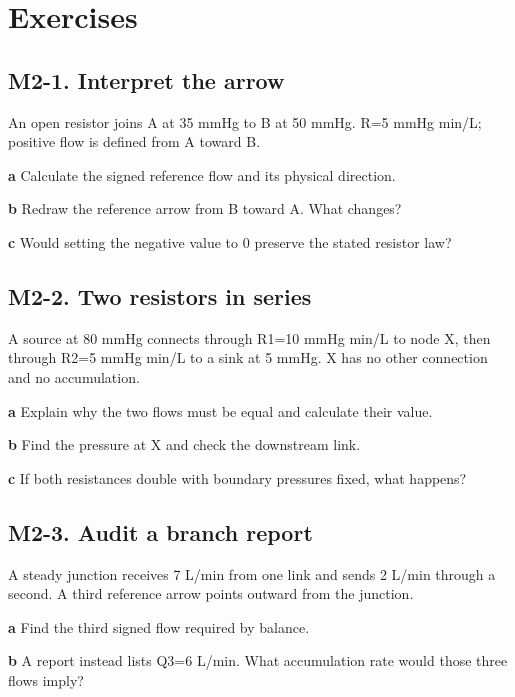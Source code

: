 \documentclass[11pt,letterpaper]{article}
\theoremstyle{definition}\newtheorem{definition}{Definition}\newtheorem{example}{Example}
\numberwithin{equation}{section}
\begin{document}
\section*{Exercises}
\par\noindent\begin{minipage}{\linewidth}
\subsection*{M2-1. Interpret the arrow}
An open resistor joins A at 35 mmHg to B at 50 mmHg. R=\allowbreak{}5 mmHg min/L; positive flow is defined from A toward B.

\textbf{a} Calculate the signed reference flow and its physical direction.

\end{minipage}\par\medskip
\textbf{b} Redraw the reference arrow from B toward A. What changes?

\textbf{c} Would setting the negative value to 0 preserve the stated resistor law?

\par\noindent\begin{minipage}{\linewidth}
\subsection*{M2-2. Two resistors in series}
A source at 80 mmHg connects through R1=\allowbreak{}10 mmHg min/L to node X, then through R2=\allowbreak{}5 mmHg min/L to a sink at 5 mmHg. X has no other connection and no accumulation.

\textbf{a} Explain why the two flows must be equal and calculate their value.

\end{minipage}\par\medskip
\textbf{b} Find the pressure at X and check the downstream link.

\textbf{c} If both resistances double with boundary pressures fixed, what happens?

\par\noindent\begin{minipage}{\linewidth}
\subsection*{M2-3. Audit a branch report}
A steady junction receives 7 L/min from one link and sends 2 L/min through a second. A third reference arrow points outward from the junction.

\textbf{a} Find the third signed flow required by balance.

\end{minipage}\par\medskip
\textbf{b} A report instead lists Q3=\allowbreak{}6 L/min. What accumulation rate would those three flows imply?
\end{document}
